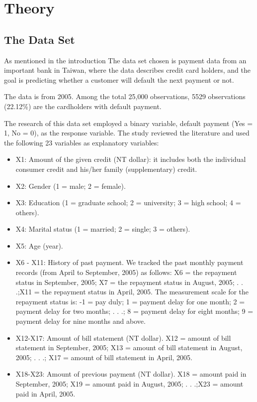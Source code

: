 \section{Theory}
\subsection{The Data Set}
As mentioned in the introduction The data set chosen is payment data 
from an important bank in Taiwan, where the data describes credit card holders,
and the goal is predicting whether a customer will default the next 
payment or not.

The data is from 2005. Among the total 25,000 observations, 5529 observations
(22.12\%) are the cardholders with default payment.~\cite{ComparisonData} 

The research of this data set  employed a binary variable, default payment 
(Yes = 1, No = 0), as the response variable. The study reviewed the 
literature and used the following 23 variables as explanatory variables: 
\begin{itemize}
		\item
X1: Amount of the given credit (NT dollar): it includes both the individual consumer credit and his/her family (supplementary) credit. 
\item
X2: Gender (1 = male; 2 = female). 
\item
X3: Education (1 = graduate school; 2 = university; 3 = high school; 4 = others). 
\item
X4: Marital status (1 = married; 2 = single; 3 = others). 
\item
X5: Age (year).
\item
X6 - X11: History of past payment. We tracked the past monthly payment records (from April to September, 2005) as follows: X6 = the repayment status in September, 2005; X7 = the repayment status in August, 2005; . . .;X11 = the repayment status in April, 2005. The measurement scale for the repayment status is: -1 = pay duly; 1 = payment delay for one month; 2 = payment delay for two months; . . .; 8 = payment delay for eight months; 9 = payment delay for nine months and above. 
\item
X12-X17: Amount of bill statement (NT dollar). X12 = amount of bill statement in September, 2005; X13 = amount of bill statement in August, 2005; . . .; X17 = amount of bill statement in April, 2005. 
\item
X18-X23: Amount of previous payment (NT dollar). X18 = amount paid in September, 2005; X19 = amount paid in August, 2005; . . .;X23 = amount paid in April, 2005. 
\end{itemize} ~\cite{CreditCardData} 

